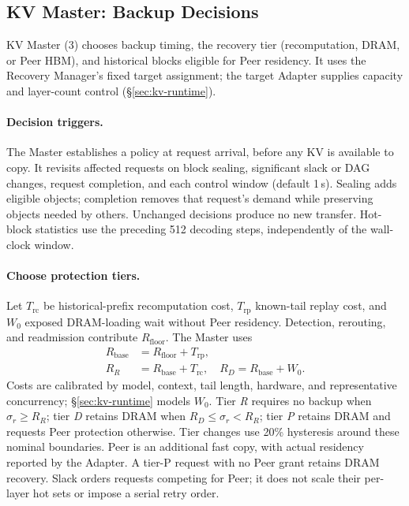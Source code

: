 \subsection{KV Master: Backup Decisions}
\label{sec:kv-placement}
\label{sec:kv-master}

KV Master (3) chooses backup timing, the recovery tier (recomputation,
DRAM, or Peer HBM), and historical blocks eligible for Peer residency.
It uses the Recovery Manager's fixed
target assignment; the target Adapter supplies capacity and layer-count
control (\S\ref{sec:kv-runtime}).

\paragraph{Decision triggers.}
The Master establishes a policy at request arrival, before any KV is
available to copy. It revisits affected requests on block sealing,
significant slack or DAG changes, request completion, and each control
window (default 1\,s). Sealing adds eligible objects; completion removes
that request's demand while preserving objects needed by others.
Unchanged decisions produce no new transfer. Hot-block statistics use
the preceding 512 decoding steps, independently of the wall-clock window.

\paragraph{Choose protection tiers.}
Let $T_{\mathrm{rc}}$ be historical-prefix recomputation cost,
$T_{\mathrm{rp}}$ known-tail replay cost, and $W_0$ exposed DRAM-loading
wait without Peer residency. Detection, rerouting, and readmission
contribute $R_{\mathrm{floor}}$. The Master uses
\begin{equation}
\begin{aligned}
 R_{\mathrm{base}}&=R_{\mathrm{floor}}+T_{\mathrm{rp}},\\
 R_R&=R_{\mathrm{base}}+T_{\mathrm{rc}},\quad
 R_D=R_{\mathrm{base}}+W_0.
\end{aligned}
\label{eq:recovery-base}
\end{equation}
Costs are calibrated by model, context, tail length, hardware, and
representative concurrency; \S\ref{sec:kv-runtime} models $W_0$.
Tier \emph{R} requires no backup when $\sigma_r\ge R_R$;
tier \emph{D} retains DRAM when $R_D\le\sigma_r<R_R$;
tier \emph{P} retains DRAM and requests Peer protection otherwise.
Tier changes use 20\% hysteresis around these nominal boundaries.
Peer is an additional fast copy, with actual residency reported by
the Adapter. A tier-P request with no Peer grant retains DRAM recovery.
Slack orders requests competing for Peer; it does not scale their
per-layer hot sets or impose a serial retry order.

